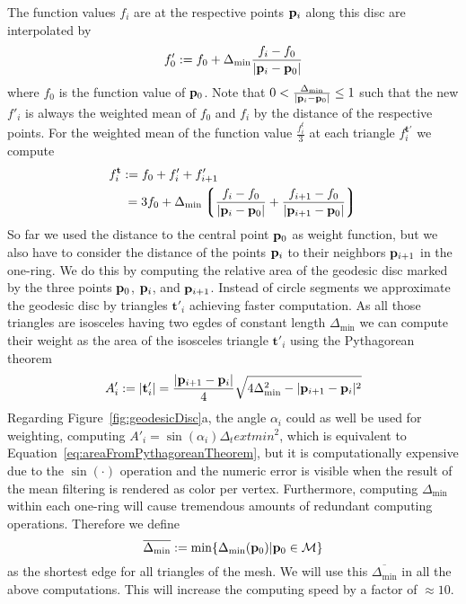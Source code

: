 The function values $f_i$ are at the respective points $\mathbf{p}_i$ along this disc are interpolated by 
\begin{equation}
	f'_0 := f_0 + \Delta_\text{min}\frac{f_i - f_0}{|\mathbf{p}_i - \mathbf{p}_0|} 
\end{equation}
where $f_0$ is the function value of $\mathbf{p}_0$. Note that $0 < \frac{
\Delta_\text{min}}{|\mathbf{p}_i - \mathbf{p}_0|} \leq 1$ such that the new 
$f'_i$ is always the weighted mean of $f_0$ and $f_i$ by the distance of the
respective points. For the weighted mean of the function value $\frac{f_i^t}{3}$ at 
each triangle $f^{\mathbf{t}'}_i$ we compute
\begin{align}
	f^{\mathbf{t}}_i & := f_0 + f'_i + f'_{i+1} \\
	& \: = 3f_0 + \Delta_\text{min}\left\lgroup\frac{f_i - f_0}{|\mathbf{p}_i - \mathbf{p}_0|} + 
	\frac{f_{i+1} - f_0}{|\mathbf{p}_{i+1} - \mathbf{p}_0|}\right\rgroup
\end{align}
So far we used the distance to the central point $\mathbf{p}_0$ as weight 
function, but we also have to consider the distance of the points 
$\mathbf{p}_i$ to their neighbors $\mathbf{p}_{i+1}$ in the one-ring. We do this 
by computing the relative area of the geodesic disc marked by the three points 
$\mathbf{p}_0$, $\mathbf{p}_i$, and $\mathbf{p}_{i+1}$. Instead of circle 
segments we approximate the geodesic disc by triangles $\mathbf{t}'_i$ achieving 
faster computation. As all those triangles are isosceles having two egdes of 
constant length $\Delta_\text{min}$ we can compute their weight as the area of the 
isosceles triangle $\mathbf{t}'_i$ using the Pythagorean theorem
\begin{equation}
	A'_i := |\mathbf{t}'_i| = \frac{|\mathbf{p}_{i+1} - \mathbf{p}_i|}{4}
	\sqrt{4\Delta_\text{min}^2 - |\mathbf{p}_{i+1} - \mathbf{p}_i|^2}
	\label{eq:areaFromPythagoreanTheorem}
\end{equation}
Regarding Figure~\ref{fig:geodesicDisc}a, the angle $\alpha_i$ could as well be 
used for weighting, computing $A'_i = \sin(\alpha_i)\Delta_text{min}^2$, which is 
equivalent to Equation~\ref{eq:areaFromPythagoreanTheorem}, but it 
is computationally expensive due to the $\sin(\cdot)$ operation and the numeric error 
is visible when the result of the mean filtering is rendered as color per 
vertex. Furthermore, computing $\Delta_\text{min}$ within each one-ring will cause 
tremendous amounts of redundant computing operations. Therefore we define 
\begin{equation}
	\overline{\Delta_\text{min}} := \min\{\Delta_\text{min}(\mathbf{p}_0) | 
	\mathbf{p}_0 \in \mathcal{M}\}
\end{equation} 
as the shortest edge for all triangles of the mesh. We will use this 
$\overline{\Delta_\text{min}}$ in all the above computations. This will increase the 
computing speed by a factor of $\approx 10$. 

